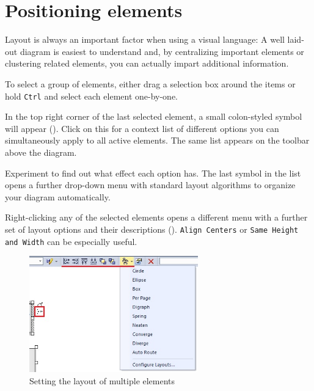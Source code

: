 \section{Positioning elements}

Layout is always an important factor when using a visual language:
A well laid-out diagram is easiest to understand and, by centralizing important
elements or clustering related elements, you can actually impart additional information.

\begin{stepbystep}
\item To select a group of elements, either drag a selection box around the items or hold \texttt{Ctrl} and select each element
one-by-one.

\item In the top right corner of the last selected element, a small colon-styled symbol will appear (). Click on
this for a context list of different options you can simultaneously apply to all active elements. The same list appears on the toolbar above the
diagram. 

\item Experiment to find out what effect each option has. The last symbol in the list opens a further drop-down menu with standard layout
algorithms to organize your diagram automatically.

\item Right-clicking any of the selected elements opens a different menu with a further set of layout options and their descriptions
(). \texttt{Align Centers} or \texttt{Same Height and Width} can be especially useful.

\begin{figure}[htbp]
\begin{center} 
  \includegraphics[width=0.65\textwidth]{../../org.moflon.doc.handbook.05_miscellaneous/1_grokkingEA/01_layOutElements/ea_layoutElementsCommonContext}
  \caption{Setting the layout of multiple elements}  
  \label{ea:layout1}
\end{center}
\end{figure}


\end{stepbystep}
